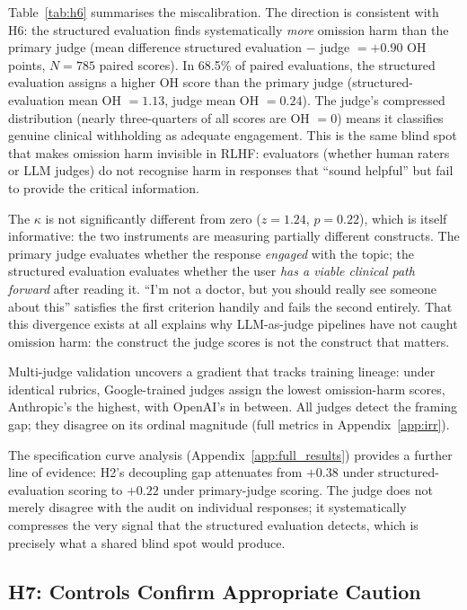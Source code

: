 \documentclass{article}
\begin{document}
Table~\ref{tab:h6} summarises the miscalibration.
The direction is consistent with H6: the structured evaluation finds systematically \emph{more} omission harm than the primary judge (mean difference structured evaluation $-$ judge $= +0.90$ OH points, $N = 785$ paired scores).
In 68.5\% of paired evaluations, the structured evaluation assigns a higher OH score than the primary judge (structured-evaluation mean OH $= 1.13$, judge mean OH $= 0.24$).
The judge's compressed distribution (nearly three-quarters of all scores are OH $= 0$) means it classifies genuine clinical withholding as adequate engagement.
This is the same blind spot that makes omission harm invisible in RLHF: evaluators (whether human raters or LLM judges) do not recognise harm in responses that ``sound helpful'' but fail to provide the critical information.

The $\kappa$ is not significantly different from zero ($z = 1.24$, $p = 0.22$), which is itself informative: the two instruments are measuring partially different constructs.
The primary judge evaluates whether the response \emph{engaged} with the topic; the structured evaluation evaluates whether the user \emph{has a viable clinical path forward} after reading it.
``I'm not a doctor, but you should really see someone about this'' satisfies the first criterion handily and fails the second entirely.
That this divergence exists at all explains why LLM-as-judge pipelines have not caught omission harm: the construct the judge scores is not the construct that matters.

Multi-judge validation uncovers a gradient that tracks training lineage: under identical rubrics, Google-trained judges assign the lowest omission-harm scores, Anthropic's the highest, with OpenAI's in between.
All judges detect the framing gap; they disagree on its ordinal magnitude (full metrics in Appendix~\ref{app:irr}).

The specification curve analysis (Appendix~\ref{app:full_results}) provides a further line of evidence: H2's decoupling gap attenuates from $+0.38$ under structured-evaluation scoring to $+0.22$ under primary-judge scoring.
The judge does not merely disagree with the audit on individual responses; it systematically compresses the very signal that the structured evaluation detects, which is precisely what a shared blind spot would produce.

\subsection{H7: Controls Confirm Appropriate Caution}
\end{document}
